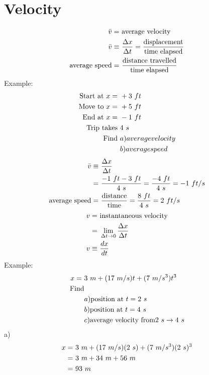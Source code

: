 \section{Velocity}
	\begin{align}
		\bar{v} = \ &\text{average velocity}& \notag \\
		\bar{v} \equiv \ &\frac{\Delta x}{\Delta t} = \frac{\text{displacement}}{\text{time elapsed}}& \notag \\
		\text{average speed} = \ &\frac{\text{distance travelled}}{\text{time elapsed}}& \notag
	\end{align}
	Example:
	\begin{align}
		\text{Start at } x = \ &+3 \ ft& \notag \\
		\text{Move to } x = \ &+5 \ ft& \notag \\
		\text{End at } x = \ &-1 \ ft& \notag \\
		\text{Trip takes } &4 \ s& \notag \\
		\text{Find } &a) average velocity& \notag \\
		&b) average speed& \notag
	\end{align}
	\begin{align}
		\bar{v} \equiv \ &\frac{\Delta x}{\Delta t}& \notag \\
		= \ &\frac{-1 \ ft - 3 \ ft}{4 \ s} = \frac{-4 \ ft}{4 \ s} = -1 \ ft/s& \notag \\
		\text{average speed} = \ &\frac{\text{distance}}{\text{time}} = \frac{8 \ ft}{4 \ s} = 2 \ ft/s& \notag
	\end{align}
	\begin{align}
		v = \ &\text{instantaneous velocity}& \notag \\
		= \ &\lim_{\Delta t \to 0} \frac{\Delta x}{\Delta t}& \notag \\
		v \equiv \ &\frac{dx}{dt}& \notag
	\end{align}
	Example:
	\begin{align}
		x = \ &3 \ m + (17 \ m/s)t + (7 \ m/s^{3})t^{3}& \notag \\
		\text{Find} && \notag \\
		&a) \text{position at } t = 2 \ s& \notag \\
		&b) \text{position at } t = 4 \ s& \notag \\
		&c) \text{average velocity from} 2 \ s \to 4 \ s& \notag
	\end{align}
	a)
	\begin{align}
		x = \ &3 \ m + (17 \ m/s)(2 \ s) + (7 \ m/s^{3})(2 \ s)^{3}& \notag \\
		= \ &3 \ m + 34 \ m + 56 \ m& \notag \\
		= \ &93 \ m& \notag \\
	\end{align}
